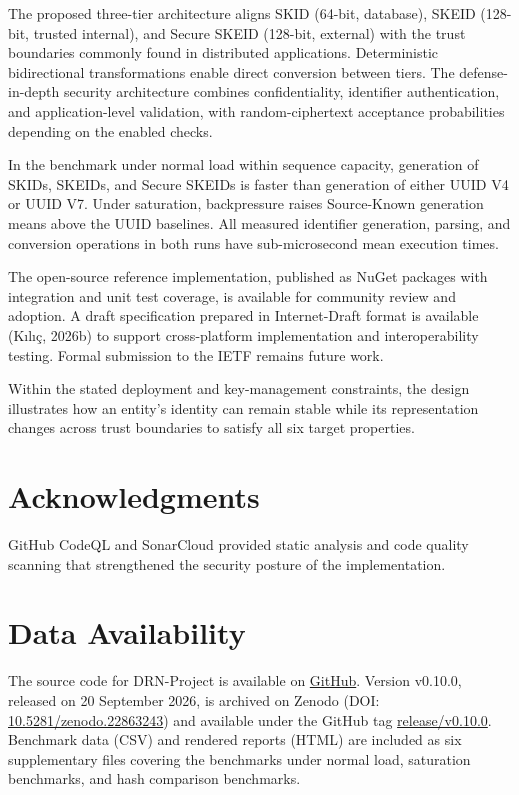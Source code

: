 \documentclass[fleqn,10pt,lineno]{wlpeerj}
\begin{document}
The proposed three-tier architecture aligns SKID (64-bit, database),
SKEID (128-bit, trusted internal), and Secure SKEID (128-bit, external)
with the trust boundaries commonly found in distributed applications.
Deterministic bidirectional transformations enable direct conversion
between tiers. The defense-in-depth security architecture combines
confidentiality, identifier authentication, and application-level
validation, with random-ciphertext acceptance probabilities depending on
the enabled checks.

In the benchmark under normal load within sequence capacity, generation
of SKIDs, SKEIDs, and Secure SKEIDs is faster than generation of either
UUID V4 or UUID V7. Under saturation, backpressure raises Source-Known
generation means above the UUID baselines. All measured identifier
generation, parsing, and conversion operations in both runs have
sub-microsecond mean execution times.

The open-source reference implementation, published as NuGet packages
with integration and unit test coverage, is available for community
review and adoption. A draft specification prepared in Internet-Draft
format is available (Kılıç, 2026b) to support cross-platform
implementation and interoperability testing. Formal submission to the
IETF remains future work.

Within the stated deployment and key-management constraints, the design
illustrates how an entity's identity can remain stable while its
representation changes across trust boundaries to satisfy all six target
properties.

\section{Acknowledgments}\label{acknowledgments}

GitHub CodeQL and SonarCloud provided static analysis and code quality
scanning that strengthened the security posture of the implementation.

\section{Data Availability}\label{data-availability}

The source code for DRN-Project is available on
\href{https://github.com/duranserkan/DRN-Project}{GitHub}. Version
v0.10.0, released on 20 September 2026, is archived on Zenodo (DOI:
\href{https://doi.org/10.5281/zenodo.22863243}{10.5281/zenodo.22863243})
and available under the GitHub tag
\href{https://github.com/duranserkan/DRN-Project/tree/release/v0.10.0}{release/v0.10.0}.
Benchmark data (CSV) and rendered reports (HTML) are included as six
supplementary files covering the benchmarks under normal load,
saturation benchmarks, and hash comparison benchmarks.
\end{document}

